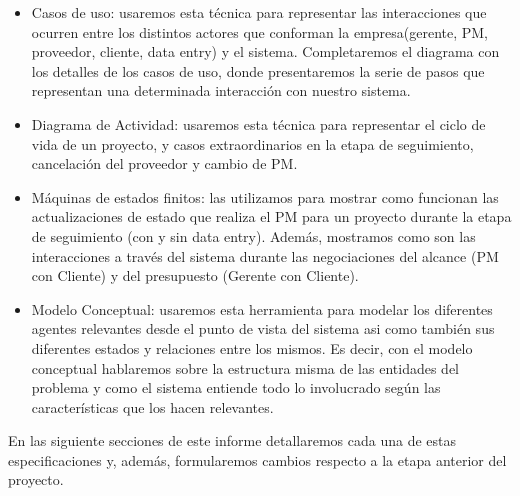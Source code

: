  \begin{itemize}
  \item Casos de uso: usaremos esta técnica para representar las interacciones que ocurren entre los distintos
  actores que conforman la empresa(gerente, PM, proveedor, cliente, data entry) y el sistema. Completaremos
  el diagrama con los detalles de los casos de uso, donde presentaremos la serie de pasos que representan una
  determinada interacción con nuestro sistema.
  \item Diagrama de Actividad: usaremos esta técnica para representar el ciclo de vida de un proyecto, y casos extraordinarios en la etapa de seguimiento, cancelación del proveedor y cambio de PM.
  \item Máquinas de estados finitos: las utilizamos para mostrar como funcionan las actualizaciones de estado que realiza el PM para un proyecto
  durante la etapa de seguimiento (con y sin data entry). Además, mostramos como son las interacciones a través del sistema durante las negociaciones
  del alcance (PM con Cliente) y del presupuesto (Gerente con Cliente).
  \item Modelo Conceptual: usaremos esta herramienta para modelar los diferentes agentes relevantes desde el punto de vista del sistema asi como también sus diferentes estados y relaciones entre los mismos. Es decir, con el modelo conceptual hablaremos sobre la estructura misma de las entidades del problema y como el sistema entiende todo lo involucrado según las características que los hacen relevantes.
 \end{itemize}

En las siguiente secciones de este informe detallaremos cada una de estas especificaciones y, además, formularemos cambios respecto a la etapa anterior del
proyecto.
